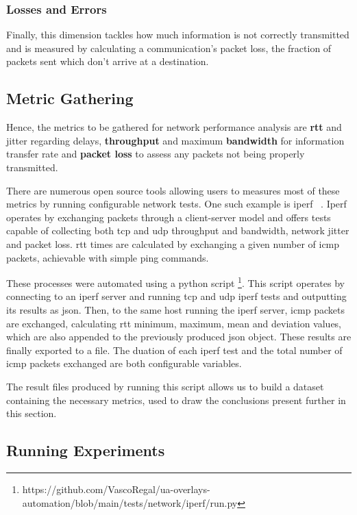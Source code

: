 \documentclass[11pt,twoside,a4paper]{report}
\begin{document}
\subsubsection{Losses and Errors}

Finally, this dimension tackles how much information is not correctly transmitted and is measured by calculating a communication's packet loss, the fraction of packets sent which don't arrive at a destination.

\subsection{Metric Gathering}

Hence, the metrics to be gathered for network performance analysis are \textbf{\ac{rtt}} and jitter regarding delays, \textbf{throughput} and maximum \textbf{bandwidth} for information transfer rate and \textbf{packet loss} to assess any packets not being properly transmitted.

There are numerous open source tools allowing users to measures most of these metrics by running configurable network tests. One such example is iperf ~\cite{iperfws}. Iperf operates by exchanging packets through a client-server model and offers tests capable of collecting both \ac{tcp} and \ac{udp} throughput and bandwidth, network jitter and packet loss. \ac{rtt} times are calculated by exchanging a given number of \ac{icmp} packets, achievable with simple ping commands.

These processes were automated using a python script \footnote{https://github.com/VascoRegal/ua-overlays-automation/blob/main/tests/network/iperf/run.py}. This script operates by connecting to an iperf server and running \ac{tcp} and \ac{udp} iperf tests and outputting its results as \ac{json}. Then, to the same host running the iperf server, \ac{icmp} packets are exchanged, calculating \ac{rtt} minimum, maximum, mean and deviation values, which are also appended to the previously produced \ac{json} object. These results are finally exported to a file. The duation of each iperf test and the total number of \ac{icmp} packets exchanged are both configurable variables.

The result files produced by running this script allows us to build a dataset containing the necessary metrics, used to draw the conclusions present further in this section.

\subsection{Running Experiments}
\end{document}
